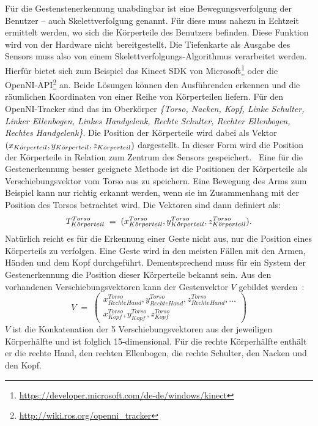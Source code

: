 Für die Gestenstenerkennung unabdingbar ist eine Bewegungsverfolgung der Benutzer -- auch Skelettverfolgung genannt. Für diese muss nahezu in Echtzeit ermittelt werden, wo sich die Körperteile des Benutzers befinden. Diese Funktion wird von der Hardware nicht bereitgestellt. Die Tiefenkarte als Ausgabe des Sensors muss also von einem Skelettverfolgungs-Algorithmus verarbeitet werden. Hierfür bietet sich zum Beispiel das Kinect SDK von Microsoft\footnote{\url{https://developer.microsoft.com/de-de/windows/kinect}} oder die OpenNI-API\footnote{\url{http://wiki.ros.org/openni_tracker}} an. Beide Lösungen können den Ausführenden erkennen und die räumlichen Koordinaten von einer Reihe von Körperteilen liefern. Für den OpenNI-Tracker sind das im Oberkörper \textit{\{Torso, Nacken, Kopf, Linke Schulter, Linker Ellenbogen, Linkes Handgelenk, Rechte Schulter, Rechter Ellenbogen, Rechtes Handgelenk\}}. Die Position der Körperteile wird dabei als Vektor $(x_{K\Ddot{o}rperteil}, y_{K\Ddot{o}rperteil}, z_{K\Ddot{o}rperteil})$ dargestellt. In dieser Form wird die Position der Körperteile in Relation zum Zentrum des Sensors gespeichert.~\cite{skeletonTracking} Eine für die Gestenerkennung besser geeignete Methode ist die Positionen der Körperteile als Verschiebungsvektor vom Torso aus zu speichern. Eine Bewegung des Arms zum Beispiel kann nur richtig erkannt werden, wenn sie im Zusammenhang mit der Position des Torsos betrachtet wird. Die Vektoren sind dann definiert als: 
\begin{equation}
    T_{K\Ddot{o}rperteil}^{Torso} \; = \; (x_{K\Ddot{o}rperteil}^{Torso}, y_{K\Ddot{o}rperteil}^{Torso}, z_{K\Ddot{o}rperteil}^{Torso}). 
\end{equation}
Natürlich reicht es für die Erkennung einer Geste nicht aus, nur die Position eines Körperteils zu verfolgen. Eine Geste wird in den meisten Fällen mit den Armen, Händen und dem Kopf durchgeführt. Dementsprechend muss für ein System der Gestenerkennung die Position dieser Körperteile bekannt sein. Aus den vorhandenen Verschiebungsvektoren kann der Gestenvektor $V$ gebildet werden~\cite{flexibleSystem}:
\begin{equation} \label{Gestenvektor}
    V \; = \; \begin{pmatrix}x_{Rechte Hand}^{Torso}, y_{Rechte Hand}^{Torso}, z_{Rechte Hand}^{Torso}, ...\\x_{Kopf}^{Torso}, y_{Kopf}^{Torso}, z_{Kopf}^{Torso}\end{pmatrix} 
\end{equation}
$V$ ist die Konkatenation der 5 Verschiebungsvektoren aus der jeweiligen Körperhälfte und ist folglich 15-dimensional. Für die rechte Körperhälfte enthält er die rechte Hand, den rechten Ellenbogen, die rechte Schulter, den Nacken und den Kopf.~\cite{flexibleSystem}

